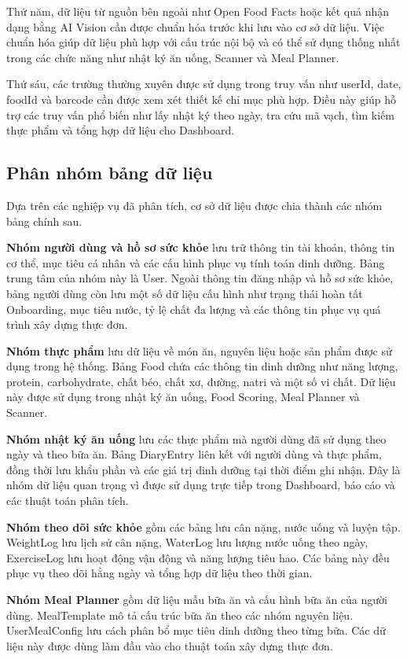 \documentclass[12pt, a4paper]{report}
\begin{document}
Thứ năm, dữ liệu từ nguồn bên ngoài như Open Food Facts hoặc kết quả nhận dạng bằng AI Vision cần được chuẩn hóa trước khi lưu vào cơ sở dữ liệu. Việc chuẩn hóa giúp dữ liệu phù hợp với cấu trúc nội bộ và có thể sử dụng thống nhất trong các chức năng như nhật ký ăn uống, Scanner và Meal Planner.

Thứ sáu, các trường thường xuyên được sử dụng trong truy vấn như userId, date, foodId và barcode cần được xem xét thiết kế chỉ mục phù hợp. Điều này giúp hỗ trợ các truy vấn phổ biến như lấy nhật ký theo ngày, tra cứu mã vạch, tìm kiếm thực phẩm và tổng hợp dữ liệu cho Dashboard.

\subsection{Phân nhóm bảng dữ liệu}Dựa trên các nghiệp vụ đã phân tích, cơ sở dữ liệu được chia thành các nhóm bảng chính sau.

\textbf{Nhóm người dùng và hồ sơ sức khỏe} lưu trữ thông tin tài khoản, thông tin cơ thể, mục tiêu cá nhân và các cấu hình phục vụ tính toán dinh dưỡng. Bảng trung tâm của nhóm này là User. Ngoài thông tin đăng nhập và hồ sơ sức khỏe, bảng người dùng còn lưu một số dữ liệu cấu hình như trạng thái hoàn tất Onboarding, mục tiêu nước, tỷ lệ chất đa lượng và các thông tin phục vụ quá trình xây dựng thực đơn.

\textbf{Nhóm thực phẩm} lưu dữ liệu về món ăn, nguyên liệu hoặc sản phẩm được sử dụng trong hệ thống. Bảng Food chứa các thông tin dinh dưỡng như năng lượng, protein, carbohydrate, chất béo, chất xơ, đường, natri và một số vi chất. Dữ liệu này được sử dụng trong nhật ký ăn uống, Food Scoring, Meal Planner và Scanner.

\textbf{Nhóm nhật ký ăn uống} lưu các thực phẩm mà người dùng đã sử dụng theo ngày và theo bữa ăn. Bảng DiaryEntry liên kết với người dùng và thực phẩm, đồng thời lưu khẩu phần và các giá trị dinh dưỡng tại thời điểm ghi nhận. Đây là nhóm dữ liệu quan trọng vì được sử dụng trực tiếp trong Dashboard, báo cáo và các thuật toán phân tích.

\textbf{Nhóm theo dõi sức khỏe} gồm các bảng lưu cân nặng, nước uống và luyện tập. WeightLog lưu lịch sử cân nặng, WaterLog lưu lượng nước uống theo ngày, ExerciseLog lưu hoạt động vận động và năng lượng tiêu hao. Các bảng này đều phục vụ theo dõi hằng ngày và tổng hợp dữ liệu theo thời gian.

\textbf{Nhóm Meal Planner} gồm dữ liệu mẫu bữa ăn và cấu hình bữa ăn của người dùng. MealTemplate mô tả cấu trúc bữa ăn theo các nhóm nguyên liệu. UserMealConfig lưu cách phân bổ mục tiêu dinh dưỡng theo từng bữa. Các dữ liệu này được dùng làm đầu vào cho thuật toán xây dựng thực đơn.
\end{document}

